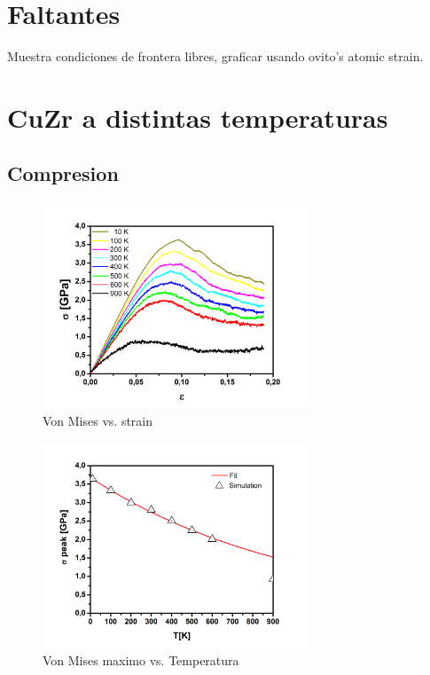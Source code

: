 \documentclass[10pt, oneside]{article} %
\begin{document}
 
\section{Faltantes}

Muestra condiciones de frontera libres, graficar usando ovito's atomic strain.
 
\section{CuZr a distintas temperaturas}

%
%

\subsection{Compresion}

\begin{figure}[H]
\centering
\includegraphics[width=8cm]{Figures/stress_strain_COMP.png}
\caption{Von Mises vs. strain}
\end{figure}

\begin{figure}[H]
\centering
\includegraphics[width=8cm]{Figures/peakstress_T_COMP.png}
\caption{Von Mises maximo vs. Temperatura}
\end{figure}
\end{document}
